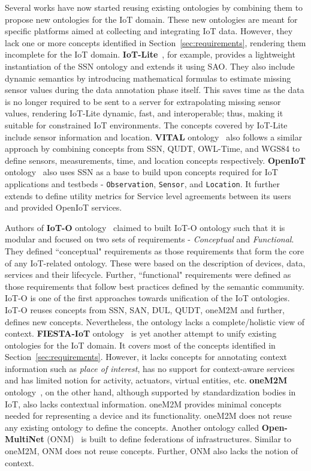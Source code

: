 \documentclass{elsart}  %
\begin{document}
Several works have now started reusing existing ontologies by combining them to propose new ontologies for the IoT domain. These new ontologies are meant for specific platforms aimed at collecting and integrating IoT data. However, they lack one or more concepts identified in Section~\ref{sec:requirements}, rendering them incomplete for the IoT domain. \textbf{IoT-Lite}~\cite{bermudez2016iot}, for example, provides a lightweight instantiation of the SSN ontology and extends it using SAO. They also include dynamic semantics by introducing mathematical formulas to estimate missing sensor values during the data annotation phase itself. This saves time as the data is no longer required to be sent to a server for extrapolating missing sensor values, rendering IoT-Lite dynamic, fast, and interoperable; thus, making it suitable for constrained IoT environments. The concepts covered by IoT-Lite include sensor information and location. \textbf{VITAL} ontology~\cite{kazmi2016overcoming} also follows a similar approach by combining concepts from SSN, QUDT, OWL-Time, and WGS84 to define sensors, measurements, time, and location concepts respectively. \textbf{OpenIoT} ontology~\cite{vanderSchaaf2015} also uses SSN as a base to build upon concepts required for IoT applications and testbeds - \texttt{Observation}, \texttt{Sensor}, and \texttt{Location}. It further extends to define utility metrics for Service level agreements between its users and provided OpenIoT services. 

Authors of \textbf{IoT-O} ontology~\cite{Seydoux2016} claimed to built IoT-O ontology such that it is modular and focused on two sets of requirements - \textit{Conceptual} and \textit{Functional}. They defined ``conceptual" requirements as those requirements that form the core of any IoT-related ontology. These were based on the description of devices, data, services and their lifecycle. Further, ``functional" requirements were defined as those requirements that follow best practices defined by the semantic community. IoT-O is one of the first approaches towards unification of the IoT ontologies. IoT-O reuses concepts from SSN, SAN, DUL, QUDT, oneM2M and further, defines new concepts. Nevertheless, the ontology lacks a complete/holistic view of context. \textbf{FIESTA-IoT} ontology~\cite{agarwal2016unified} is yet another attempt to unify existing ontologies for the IoT domain. It covers most of the concepts identified in Section~\ref{sec:requirements}. However, it lacks concepts for annotating context information such as \textit{place of interest}, has no support for context-aware services and has limited notion for activity, actuators, virtual entities, etc. \textbf{oneM2M} ontology~\cite{oneM2M2016}, on the other hand, although supported by standardization bodies in IoT, also lacks contextual information. oneM2M provides minimal concepts needed for representing a device and its functionality. oneM2M does not reuse any existing ontology to define the concepts. Another ontology called \textbf{Open-MultiNet} (ONM)~\cite{Willner2015} is built to define federations of infrastructures. Similar to oneM2M, ONM does not reuse concepts. Further, ONM also lacks the notion of context. 
\end{document}
